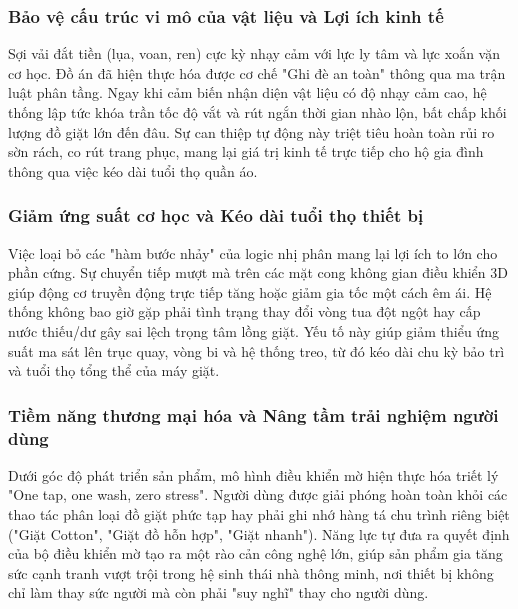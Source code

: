 \documentclass[12pt, a4paper]{article}
\begin{document}
\subsubsection{Bảo vệ cấu trúc vi mô của vật liệu và Lợi ích kinh tế}
Sợi vải đắt tiền (lụa, voan, ren) cực kỳ nhạy cảm với lực ly tâm và lực xoắn vặn cơ học. Đồ án đã hiện thực hóa được cơ chế "Ghi đè an toàn" thông qua ma trận luật phân tầng. Ngay khi cảm biến nhận diện vật liệu có độ nhạy cảm cao, hệ thống lập tức khóa trần tốc độ vắt và rút ngắn thời gian nhào lộn, bất chấp khối lượng đồ giặt lớn đến đâu. Sự can thiệp tự động này triệt tiêu hoàn toàn rủi ro sờn rách, co rút trang phục, mang lại giá trị kinh tế trực tiếp cho hộ gia đình thông qua việc kéo dài tuổi thọ quần áo.

\subsubsection{Giảm ứng suất cơ học và Kéo dài tuổi thọ thiết bị}
Việc loại bỏ các "hàm bước nhảy" của logic nhị phân mang lại lợi ích to lớn cho phần cứng. Sự chuyển tiếp mượt mà trên các mặt cong không gian điều khiển 3D giúp động cơ truyền động trực tiếp tăng hoặc giảm gia tốc một cách êm ái. Hệ thống không bao giờ gặp phải tình trạng thay đổi vòng tua đột ngột hay cấp nước thiếu/dư gây sai lệch trọng tâm lồng giặt. Yếu tố này giúp giảm thiểu ứng suất ma sát lên trục quay, vòng bi và hệ thống treo, từ đó kéo dài chu kỳ bảo trì và tuổi thọ tổng thể của máy giặt.

\subsubsection{Tiềm năng thương mại hóa và Nâng tầm trải nghiệm người dùng}
Dưới góc độ phát triển sản phẩm, mô hình điều khiển mờ hiện thực hóa triết lý "One tap, one wash, zero stress". Người dùng được giải phóng hoàn toàn khỏi các thao tác phân loại đồ giặt phức tạp hay phải ghi nhớ hàng tá chu trình riêng biệt ("Giặt Cotton", "Giặt đồ hỗn hợp", "Giặt nhanh"). Năng lực tự đưa ra quyết định của bộ điều khiển mờ tạo ra một rào cản công nghệ lớn, giúp sản phẩm gia tăng sức cạnh tranh vượt trội trong hệ sinh thái nhà thông minh, nơi thiết bị không chỉ làm thay sức người mà còn phải "suy nghĩ" thay cho người dùng.
\end{document}
